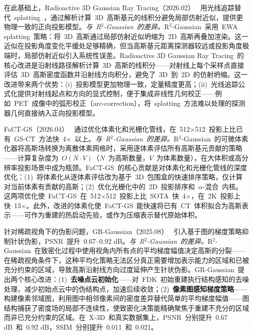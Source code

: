 在此基础上，Radioactive 3D Gaussian Ray Tracing（2026.02）~\cite{2602_01057} 用光线追踪替代~splatting~，通过解析计算~3D~高斯基元的线积分避免局部仿射近似，提供更物理一致的正向投影模型。\textit{与~R$^2$-Gaussian~的差异。}R$^2$-Gaussian~采用~EWA splatting~策略：将~3D~高斯通过局部仿射近似坍缩为~2D~高斯再叠加渲染。这一近似在投影角度变化平缓处足够精确，但当高斯基元距离探测器较远或投影角度极端时，局部仿射近似引入系统性误差。Radioactive 3D Gaussian Ray Tracing~的核心改进是沿射线路径解析计算~3D~高斯的线积分——对射线上每个采样点直接评估~3D~高斯密度函数并沿射线方向积分，避免了~3D~到~2D~的仿射坍缩。这一改进带来两个优势：(i)~投影模型更加物理一致，定量精度更高；(ii)~光线追踪公式化提供对射线起点和方向的显式控制，便于集成非线性几何校正——例如~PET~成像中的弧形校正（arc-correction），将~splatting~方法难以处理的探测器几何直接纳入正向投影模型。

FaCT-GS（2026.04）~\cite{2604_01844} 通过优化体素化和光栅化管线，在~512$\times$512~投影上比已有~GS-CT~方法快~4$\times$~以上。\textit{与~R$^2$-Gaussian~的差异。}R$^2$-Gaussian~的可微体素化器将高斯场转换为离散体素网格时，采用逐体素评估所有高斯基元贡献的策略——计算复杂度为~$O(N \cdot V)$（$N$~为高斯数量，$V$~为体素数量），在大体积或高分辨率投影场景中成为瓶颈。FaCT-GS~的核心贡献是对体素化和光栅化管线的深度优化：(1)~将体素化从逐体素评估改为基于~3D~包围盒的快速排序策略，仅计算对当前体素有贡献的高斯；(2)~优化光栅化中的~2D~投影排序和~$\alpha$-混合~内核。这两项优化使~FaCT-GS~在~512$\times$512~投影上比~SOTA~快~4$\times$，在~2K~投影上快~13$\times$。此外，改进的体素化使~FaCT-GS~能快速将已有~CT~体积拟合为高斯表示——可作为重建的热启动先验，或作为压缩表示替代原始体积。

针对稀疏视角下的伪影问题，GR-Gaussian（2025.08）~\cite{2508_02408} 引入基于图的梯度策略抑制针状伪影，PSNR~提升~0.67--0.92 dB。\textit{与~R$^2$-Gaussian~的差异。}R$^2$-Gaussian~在致密化过程中使用视角内所有点的平均梯度幅值决定高斯的分裂——在稀疏视角条件下，这种平均化策略无法区分真正需要增加表示能力的区域和已被充分约束的区域，导致高斯沿射线方向过度延伸产生针状伪影。GR-Gaussian~提出两个核心改进：(1)~\textbf{去噪点云初始化}——对~FDK~初始重建执行结构感知的去噪处理，减少初始点云中的伪结构点，加速后续收敛；(2)~\textbf{像素图感知梯度策略}——构建像素邻域图，利用图中相邻像素间的密度差异替代简单的平均梯度幅值——图结构捕获了密度场的局部不连续性，使致密化决策能精确聚焦于重建不充分的区域而非已充分约束的区域。在~X-3D~和真实数据集上，PSNR~分别提升~0.67 dB~和~0.92 dB，SSIM~分别提升~0.011~和~0.021。


